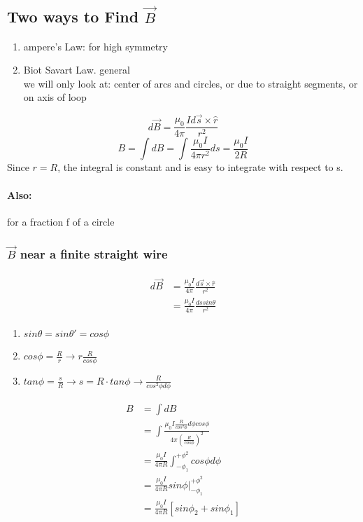 \documentclass{article}
\begin{document}
    \subsection{Two ways to Find $\vec{B}$}
    \begin{enumerate}
        \item ampere's Law: for high symmetry
        \item Biot Savart Law. general\\
        we will only look at: center of arcs and circles, or due to straight segments, or on axis of loop
    \end{enumerate}
    $$d\vec{B} = \frac{\mu_0}{4\pi}\frac{Id\vec{s}\times \hat{r}}{r^2}$$
    $$B = \int dB = \int \frac{\mu_0 I}{4 \pi r^2}ds = \frac{\mu_0 I}{2R}$$
    Since $r=R$, the integral is constant and is easy to integrate with respect to s.
    \paragraph{Also:}for a fraction f of a circle 
    
    \subsubsection{$\vec{B}$ near a finite straight wire}
   
    \begin{align*}
        \begin{split}
            d\vec{B} &= \frac{\mu_0 I}{4\pi}\frac{d\vec{s}\times \hat{r}}{r^2}\\
                &= \frac{\mu_0 I}{4\pi} \frac{ds sin\theta}{r^2}
        \end{split}
    \end{align*}

    \begin{enumerate}
        \item $sin\theta = sin\theta ' =cos\phi$
        \item $cos\phi = \frac{R}{r} \rightarrow r \frac{R}{cos\phi}$
        \item $tan\phi = \frac{s}{R} \rightarrow s =R\cdot tan\phi \rightarrow \frac{R}{cos^2\phi d\phi}$
    \end{enumerate}

    \begin{align*}
        \begin{split}
            B &= \int dB \\
            &= \int \frac{\mu_0I \frac{R}{cos^2\phi}d\phi cos\phi}{4\pi (\frac{R}{cos\phi})^2} \\
            &= \frac{\mu_0 I}{4\pi R}\int_{-\phi_1}^{+\phi^2}cos\phi d\phi \\
            &= \frac{\mu_0 I}{4\pi R}sin \phi \rvert_{-\phi_1}^{+\phi^2} \\
            &= \frac{\mu_0 I}{4\pi R}[sin \phi _2 + sin\phi _1]
        \end{split}
    \end{align*}
\end{document}
